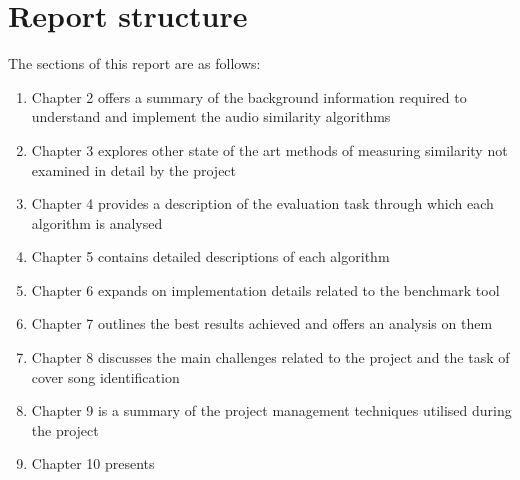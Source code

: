 \section{Report structure}
\label{structure}
The sections of this report are as follows:
\begin{enumerate}
    \item Chapter 2 offers a summary of the background information required to
    understand and implement the audio similarity algorithms
    \item Chapter 3 explores other state of the art methods of measuring
    similarity not examined in detail by the project
    \item Chapter 4 provides a description of the evaluation task through which
    each algorithm is analysed
    \item Chapter 5 contains detailed descriptions of each algorithm
    \item Chapter 6 expands on implementation details related to the benchmark
    tool
    \item Chapter 7 outlines the best results achieved and offers an analysis on
    them
    \item Chapter 8 discusses the main challenges related to the project and the
    task of cover song identification
    \item Chapter 9 is a summary of the project management techniques utilised
    during the project
    \item Chapter 10 presents 

\end{enumerate}